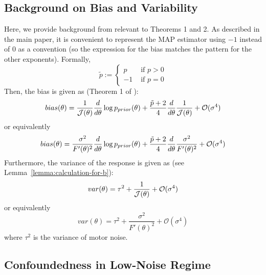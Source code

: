 \subsection{Background on Bias and Variability}\label{sec:background}
Here, we provide background from \cite{hahn2024unifying} relevant to Theorems 1 and 2.
As described in the main paper, it is convenient to represent the MAP estimator using $-1$ instead of $0$ as a convention (so the expression for the bias matches the pattern for the other exponents). Formally,
\begin{equation}\label{eq:tilde-p-also}
    \tilde{p} := \begin{cases} p &\text{ if } p > 0 \\ -1 & \text{ if } p=0\end{cases}
\end{equation}
Then, the bias is given as (Theorem 1 of \cite{hahn2024unifying}):
\begin{equation}\label{eq:bias-first-order}
bias(\theta) = \frac{1}{\mathcal{J}(\theta)} \frac{d}{d\theta} \log p_{prior}(\theta) + \frac{\tilde{p}+2}{4} \frac{d}{d\theta} \frac{1}{\mathcal{J}(\theta)}  + \mathcal{O}(\sigma^4)
\end{equation}
or equivalently
\begin{equation}\label{eq:bias-first-order}
bias(\theta) = \frac{\sigma^2}{F'(\theta)^2} \frac{d}{d\theta} \log p_{prior}(\theta) + \frac{\tilde{p}+2}{4} \frac{d}{d\theta} \frac{\sigma^2}{F'(\theta)^2}  + \mathcal{O}(\sigma^4)
\end{equation}
Furthermore, the variance of the response is given as (see Lemma~\ref{lemma:calculation-for-b}):
\begin{equation}\label{eq:var-first-order}
    var(\theta) = \tau^2 + \frac{1}{\mathcal{J}(\theta)} + \mathcal{O}(\sigma^4)
\end{equation}
or equivalently
\begin{equation}\label{eq:var-first-order}
    var(\theta) = \tau^2 + \frac{\sigma^2}{F'(\theta)^2} + \mathcal{O}(\sigma^4)
\end{equation}
where $\tau^2$ is the variance of motor noise.


\subsection{Confoundedness in Low-Noise Regime}

